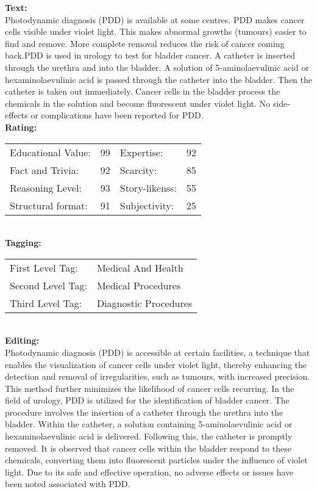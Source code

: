 \begin{tcolorbox}[title = {Case 1}, colframe=darkgreen, colback=lightgray, breakable]
\small
\textbf{Text:}\\Photodynamic diagnosis (PDD) is available at some centres. PDD makes cancer cells visible under violet light. This makes abnormal growths (tumours) easier to find and remove. More complete removal reduces the risk of cancer coming back.PDD is used in urology to test for bladder cancer. A catheter is inserted through the urethra and into the bladder. A solution of 5-aminolaevulinic acid or hexaminolaevulinic acid is passed through the catheter into the bladder. Then the catheter is taken out immediately. Cancer cells in the bladder process the chemicals in the solution and become fluorescent under violet light. No side-effects or complications have been reported for PDD.\\
\textbf{Rating:}
\\
\begin{tabular}{@{}llll}
Educational Value: & 99 & Expertise: & 92 \\ 
Fact and Trivia: & 92 & Scarcity: & 85 \\
Reasoning Level: & 93   & Story-likenss: & 55 \\ 
Structural format: & 91 & Subjectivity: & 25 \\
\end{tabular}
\\
\textbf{Tagging:}
\\
\begin{tabular}{@{}ll}
First Level Tag: & Medical And Health \\
Second Level Tag: & Medical Procedures \\
Third Level Tag: & Diagnostic Procedures \\
\end{tabular}
\\
\textbf{Editing:}
\\
Photodynamic diagnosis (PDD) is accessible at certain facilities, a technique that enables the visualization of cancer cells under violet light, thereby enhancing the detection and removal of irregularities, such as tumours, with increased precision. This method further minimizes the likelihood of cancer cells recurring. In the field of urology, PDD is utilized for the identification of bladder cancer. The procedure involves the insertion of a catheter through the urethra into the bladder. Within the catheter, a solution containing 5-aminolaevulinic acid or hexaminolaevulinic acid is delivered. Following this, the catheter is promptly removed. It is observed that cancer cells within the bladder respond to these chemicals, converting them into fluorescent particles under the influence of violet light. Due to its safe and effective operation, no adverse effects or issues have been noted associated with PDD.
\end{tcolorbox}

